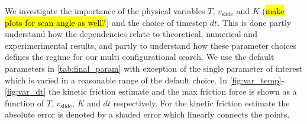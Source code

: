 We investigate the importance of the physical variables $T$, $v_{\text{slide}}$ and $K$ (\hl{make plots for scan angle as well?}) and the choice of timestep $dt$. This is done partly understand how the dependencies relate to theoretical, numerical and experimerimental results, and partly to understand how these parameter choices defines the regime for our multi configurational search. We use the default parameters in \cref{tab:final_param} with exception of the single parameter of interest which is varied in a reasonable range of the default choice. In \cref{fig:var_temp}-\cref{fig:var_dt} the kinetic friction estimate and the max friction force is shown as a function of $T$, $v_{\text{slide}}$, $K$ and $dt$ respectively. For the kinetic friction estimate the absolute error is denoted by a shaded error which linearly connects the points.


